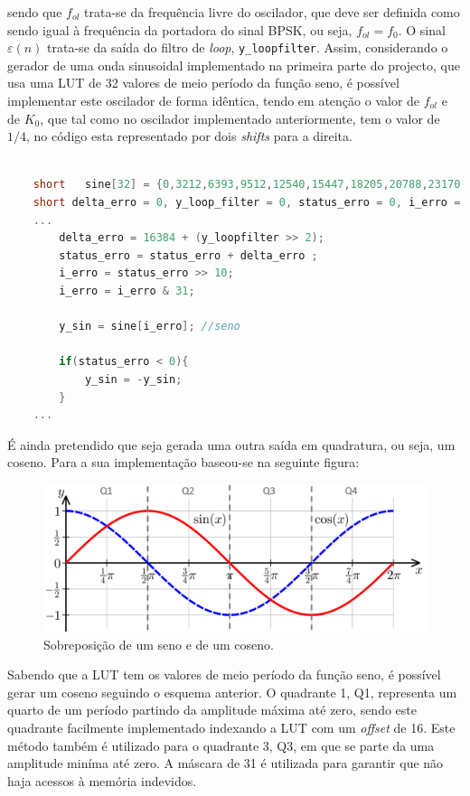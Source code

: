 \documentclass[11pt]{article}
\numberwithin{equation}{section}
\begin{document}
\vspace{1mm}
sendo que $f_{ol}$ trata-se da frequência livre do oscilador, que deve ser definida como sendo igual à frequência da portadora do sinal BPSK, ou seja, $f_{ol} = f_0$. O sinal $\varepsilon (n)$ trata-se da saída do filtro de \textit{loop}, \texttt{y\_loopfilter}. 
Assim, considerando o gerador de uma onda sinusoidal implementado na primeira parte do projecto, que usa uma LUT de 32 valores de meio período da função seno, é possível implementar este oscilador de forma idêntica, tendo em atenção o valor de $f_{ol}$ e de $K_0$, que tal como no oscilador implementado anteriormente, tem o valor de $1/4$, no código esta representado por dois \textit{shifts} para a direita.
\begin{lstlisting}[language=C]

	short	sine[32] = {0,3212,6393,9512,12540,15447,18205,20788,23170,25330,27246,28899,30274,31357,		32138,32610,32767,32610,32138,31357,30274,28899,27246,25330,23170,20788,18205,		15447,12540,9512,6393,3212}; 
	short delta_erro = 0, y_loop_filter = 0, status_erro = 0, i_erro = 0, y_sin = 0;
	...
		delta_erro = 16384 + (y_loopfilter >> 2);
		status_erro = status_erro + delta_erro ;
		i_erro = status_erro >> 10;
		i_erro = i_erro & 31;
		
		y_sin = sine[i_erro]; //seno
		
		if(status_erro < 0){
			y_sin = -y_sin;
		}	
	...

\end{lstlisting}

É ainda pretendido que seja gerada uma outra saída em quadratura, ou seja, um coseno. Para a sua implementação baseou-se na seguinte figura:
 \begin{figure}[H]
 	\centering
 	\includegraphics[keepaspectratio=true, scale=0.37]{teoricas/senocoseno}
 	\caption{Sobreposição de um seno e de um coseno.}
 	\vspace{-0.8em}
 \end{figure}
 
 Sabendo que a LUT tem os valores de meio período da função seno, é possível gerar um coseno seguindo o esquema anterior. O quadrante 1, Q1, representa um quarto de um período partindo da amplitude máxima até zero, sendo este quadrante facilmente implementado  indexando a LUT com um \textit{offset} de 16. Este método também  é utilizado para o quadrante 3, Q3, em que se parte da uma amplitude miníma até zero. A máscara de 31 é utilizada para garantir que não haja acessos à memória indevidos.
 
\end{document}
